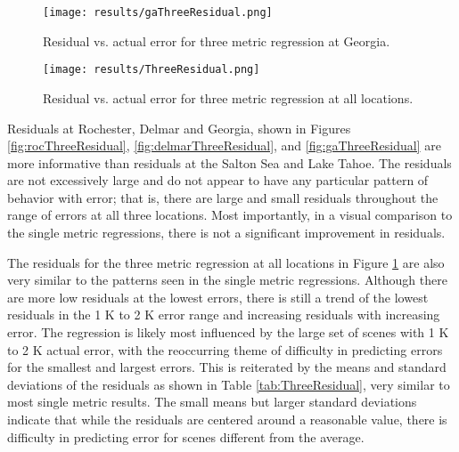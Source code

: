 \documentclass{book}
\begin{document}
\begin{figure}[H]
\begin{minipage}[b]{0.47\textwidth}
\centering
\texttt{[image: results/gaThreeResidual.png]}
\caption{Residual vs. actual error for three metric regression at Georgia.}
\label{fig:gaThreeResidual}
\end{minipage}
\begin{minipage}[b]{0.47\textwidth}
\centering
\texttt{[image: results/ThreeResidual.png]}
\caption{Residual vs. actual error for three metric regression at all locations.}
\label{fig:ThreeResidual}
\end{minipage}
\end{figure}


Residuals at Rochester, Delmar and Georgia, shown in Figures \ref{fig:rocThreeResidual}, \ref{fig:delmarThreeResidual}, and \ref{fig:gaThreeResidual} are more informative than residuals at the Salton Sea and Lake Tahoe.  The residuals are not excessively large and do not appear to have any particular pattern of behavior with error; that is, there are large and small residuals throughout the range of errors at all three locations.  Most importantly, in a visual comparison to the single metric regressions, there is not a significant improvement in residuals.

The residuals for the three metric regression at all locations in Figure \ref{fig:ThreeResidual} are also very similar to the patterns seen in the single metric regressions.  Although there are more low residuals at the lowest errors, there is still a trend of the lowest residuals in the 1 K to 2 K error range and increasing residuals with increasing error.  The regression is likely most influenced by the large set of scenes with 1 K to 2 K actual error, with the reoccurring theme of difficulty in predicting errors for the smallest and largest errors.  This is reiterated by the means and standard deviations of the residuals as shown in Table \ref{tab:ThreeResidual}, very similar to most single metric results.  The small means but larger standard deviations indicate that while the residuals are centered around a reasonable value, there is difficulty in predicting error for scenes different from the average.
\end{document}
